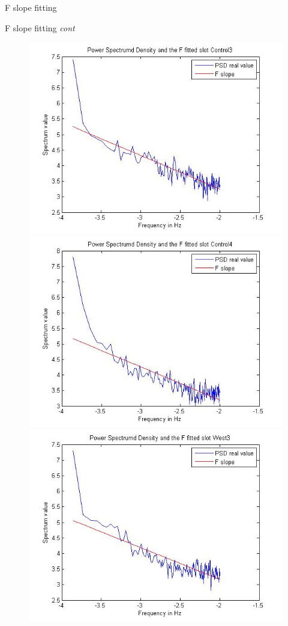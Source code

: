 \documentclass[t,12pt,english
\ifx\beamermode\undefined\else,\beamermode\fi
]{beamer}
\begin{document}
\begin{frame}{F slope fitting}
\begin{figure}[!htbp]
\endminipage\hfill
\end{figure}
\end{frame}

\begin{frame}{F slope fitting \textit{cont}}
\begin{figure}[!htbp]
%
\centering
\includegraphics[width=.7\textwidth]{E35.jpg}\\
\includegraphics[width=.7\textwidth]{E36.jpg}\\
\endminipage\hfill
{}%
\centering
\includegraphics[width=.7\textwidth]{E40.jpg}\\

\end{figure}
\end{frame}
\end{document}

